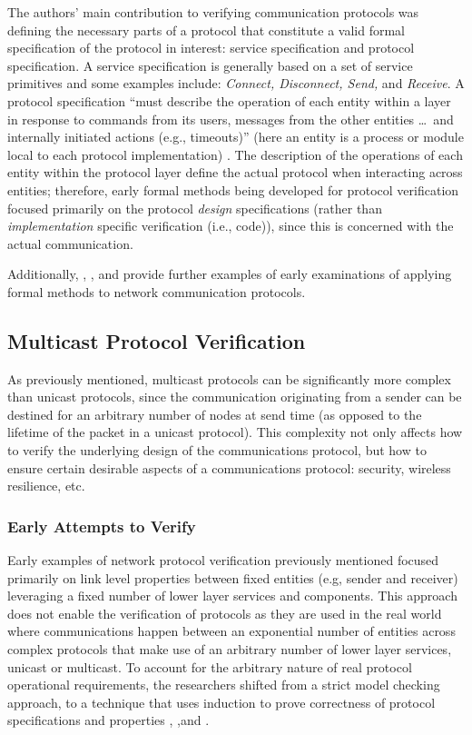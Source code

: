 \documentclass[10pt, journal]{IEEEtran}
\begin{document}
The authors' main contribution to verifying communication protocols was defining the necessary parts of a protocol that constitute a valid formal specification of the protocol in interest: service specification and protocol specification. A service specification is generally based on a set of service primitives and some examples include: \textit{Connect, Disconnect, Send,} and \textit{Receive}. A protocol specification ``must describe the operation of each entity within a layer in response to commands from its users, messages from the other entities \ldots\ and internally initiated actions (e.g., timeouts)'' (here an entity is a process or module local to each protocol implementation) \cite{Bochman1980}. The description of the operations of each entity within the protocol layer define the actual protocol when interacting across entities; therefore, early formal methods being developed for protocol verification focused primarily on the protocol \textit{design} specifications (rather than \textit{implementation} specific verification (i.e., code)), since this is concerned with the actual communication. 

Additionally, \cite{Holzmann1990}, \cite{Milner1989}, and \cite{Baptista1990} provide further examples of early examinations of applying formal methods to network communication protocols.

\subsection{Multicast Protocol Verification}
As previously mentioned, multicast protocols can be significantly more complex than unicast protocols, since the communication originating from a sender can be destined for an arbitrary number of nodes at send time (as opposed to the lifetime of the packet in a unicast protocol). This complexity not only affects how to verify the underlying design of the communications protocol, but how to ensure certain desirable aspects of a communications protocol: security, wireless resilience, etc.

\subsubsection{Early Attempts to Verify}
Early examples of network protocol verification previously mentioned focused primarily on link level properties between fixed entities (e.g, sender and receiver) leveraging a fixed number of lower layer services and components. This approach does not enable the verification of protocols as they are used in the real world where communications happen between an exponential number of entities across complex protocols that make use of an arbitrary number of lower layer services, unicast or multicast. To account for the arbitrary nature of real protocol operational requirements, the researchers shifted from a strict model checking approach, to a technique that uses induction to prove correctness of protocol specifications and properties \cite{Creese1999}, \cite{Callahan1995} ,and \cite{Baptista1990}.
\end{document}

